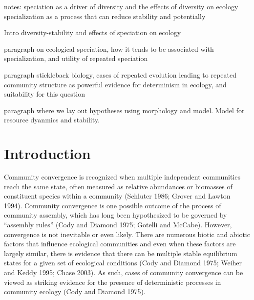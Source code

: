 \documentclass[11pt]{article}
\begin{document}
notes:
speciation as a driver of diversity and the effects of diversity on ecology
specialization as a process that can reduce stability and potentially 


Intro
diversity-stability and effects of speciation on ecology

paragraph on ecological speciation, how it tends to be associated with specialization, and utility of repeated speciation

paragraph stickleback biology, cases of repeated evolution leading to repeated community structure as powerful evidence for determinism in ecology, and suitability for this question

paragraph where we lay out hypotheses using morphology and model. Model for resource dyanmics and stability. 

\newpage{}

\section*{Introduction}



Community convergence is recognized when multiple independent communities reach the same state, often measured as relative abundances or biomasses of constituent species within a community (Schluter 1986; Grover and Lawton 1994).  Community convergence is one possible outcome of the process of community assembly, which has long been hypothesized to be governed by “assembly rules” (Cody and Diamond 1975; Gotelli and McCabe).  However, convergence is not inevitable or even likely.  There are numerous biotic and abiotic factors that influence ecological communities and even when these factors are largely similar, there is evidence that there can be multiple stable equilibrium states for a given set of ecological conditions (Cody and Diamond 1975; Weiher and Keddy 1995; Chase 2003).  As such, cases of community convergence can be viewed as striking evidence for the presence of deterministic processes in community ecology (Cody and Diamond 1975).  
\end{document}
